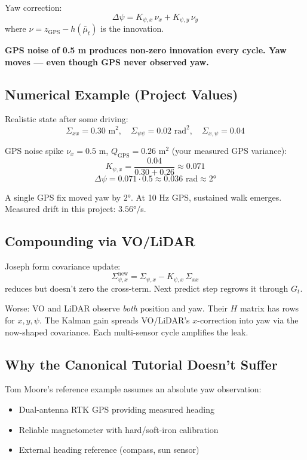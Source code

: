 \documentclass[11pt,a4paper]{article}
\begin{document}
Yaw correction:
\[
\Delta\psi = K_{\psi,x}\,\nu_x + K_{\psi,y}\,\nu_y
\]
where $\nu = z_{\text{GPS}} - h(\bar{\mu}_t)$ is the innovation.

\textbf{GPS noise of 0.5 m produces non-zero innovation every cycle. Yaw moves --- even though GPS never observed yaw.}

\subsection{Numerical Example (Project Values)}

Realistic state after some driving:
\[
\Sigma_{xx} = 0.30 \text{ m}^2, \quad \Sigma_{\psi\psi} = 0.02 \text{ rad}^2, \quad \Sigma_{x,\psi} = 0.04
\]

GPS noise spike $\nu_x = 0.5$ m, $Q_{\text{GPS}} = 0.26$ m$^2$ (your measured GPS variance):
\[
K_{\psi,x} = \frac{0.04}{0.30 + 0.26} \approx 0.071
\]
\[
\Delta\psi = 0.071 \cdot 0.5 \approx 0.036 \text{ rad} \approx 2°
\]

A single GPS fix moved yaw by $2°$. At 10 Hz GPS, sustained walk emerges. Measured drift in this project: $3.56°/$s.

\subsection{Compounding via VO/LiDAR}

Joseph form covariance update:
\[
\Sigma_{\psi,x}^{\text{new}} = \Sigma_{\psi,x} - K_{\psi,x}\,\Sigma_{xx}
\]
reduces but doesn't zero the cross-term. Next predict step regrows it through $G_t$.

Worse: VO and LiDAR observe \emph{both} position and yaw. Their $H$ matrix has rows for $x, y, \psi$. The Kalman gain spreads VO/LiDAR's $x$-correction into yaw via the now-shaped covariance. Each multi-sensor cycle amplifies the leak.

\subsection{Why the Canonical Tutorial Doesn't Suffer}

Tom Moore's reference example assumes an absolute yaw observation:
\begin{itemize}
\item Dual-antenna RTK GPS providing measured heading
\item Reliable magnetometer with hard/soft-iron calibration
\item External heading reference (compass, sun sensor)
\end{itemize}
\end{document}
